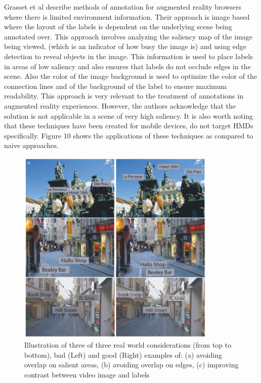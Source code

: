 \documentclass{article}
\begin{document}
Grasset et al \cite{Grasset6402555} describe methods of annotation for augmented reality browsers where there is limited environment information. Their approach is image based where the layout of the labels is dependent on the underlying scene being annotated over. This approach involves analyzing the saliency map of the image being viewed, (which is an indicator of how busy the image is) and using edge detection to reveal objects in the image. This information is used to place labels in areas of low saliency and also ensures that labels do not occlude edges in the scene. Also the color of the image background is used to optimize the color of the connection lines and of the background of the label to ensure maximum readability. This approach is very relevant to the treatment of annotations in augmented reality experiences. However, the authors acknowledge that the solution is not applicable in a scene of very high saliency. It is also worth noting that these techniques have been created for mobile devices, do not target HMDs specifically. Figure 10 shows the applications of these techniques as compared to naive approaches. 

\begin{figure}[htbp]
		\hspace{0.075\textwidth}
        \includegraphics[width=0.85\textwidth]{Images/imageBased.jpg}
    	\caption{ Illustration of three of three real world considerations (from top to bottom), bad (Left) and good (Right) examples of: (a) avoiding overlap on salient areas, (b) avoiding overlap on edges, (c) improving contrast between video image and labels \cite{Grasset6402555}
}
\end{figure}
\end{document}
